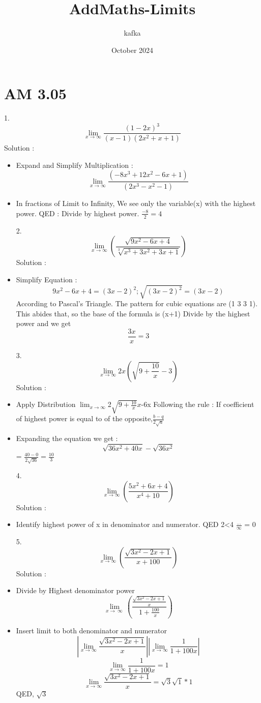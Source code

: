 \documentclass{article}
\title{AddMaths-Limits}
\author{kafka }
\date{October 2024}
\begin{document}
\maketitle


\section{AM 3.05}
1. $$\displaystyle \lim_{x\to\infty} \frac{(1-2x)^3}{(x-1)(2x^2+x+1)}$$ 
Solution :
\begin{itemize}
\item Expand and Simplify Multiplication :  
$$\displaystyle \lim_{x\to\infty}\frac{(-8x^3+12x^2-6x+1)}{(2x^3-x^2-1)}$$
\item In fractions of Limit to Infinity, We see only the variable(x) with the highest power. QED : Divide by highest power. 
$\frac{-8}{2} = 4$

2. $$\displaystyle \lim_{x\to\infty} \left(\frac{\sqrt{9x^2-6x+4}}{\sqrt[3]{x^3+3x^2+3x+1}}\right)$$
Solution : 

\item Simplify Equation : 
$$9x^2-6x+4 = (3x-2)^2; \sqrt{(3x-2)^2} = (3x-2)$$
According to Pascal's Triangle. The pattern for cubic equations are (1 3 3 1). This abides that, so the base of the formula is (x+1)
Divide by the highest power and we get $$\frac{3x}{x} = 3$$

3. $$\displaystyle \lim_{x\to\infty} 2x\left(\sqrt{9+\frac{10}{x}}-3\right)$$
Solution :

\item Apply Distribution 
$\displaystyle \lim_{x\to\infty}$2$\sqrt{9+\frac{10}{x}}x$-6x
Following the rule : If coefficient of highest power is equal to of the opposite,$\frac{b-q}{2\sqrt{a}}$
\item Expanding the equation we get :
$$\sqrt{36x^2+40x}-\sqrt{36x^2}$$ = $\frac{40-0}{2\sqrt{36}} = \frac{10}{3}$

4. $$\displaystyle \lim_{x\to\infty} \left(\frac{5x^2+6x+4}{x^4+10}\right)$$
Solution : 

\item  Identify highest power of x in denominator and numerator. QED 2<4
$\displaystyle\frac{...}{\infty}$ = 0

5. $$\displaystyle \lim_{x\to\infty}\left(\frac{\sqrt{3x^2-2x+1}}{x+100}\right)$$
Solution : 

\item Divide by Highest denominator power
$$\lim_{x\to \:\infty \:}\left(\frac{\frac{\sqrt{3x^2-2x+1}}{x}}{1+\frac{100}{x}}\right)$$
\item Insert limit to both denominator and numerator
$$\displaystyle |\lim_{x\to\infty} \frac{\sqrt{3x^2-2x+1}}{x}| |\lim_{x\to\infty}\frac{1}{1+100x}|$$
$$\displaystyle\lim_{x\to\infty}\frac{1}{1+100x} = 1$$
$$\displaystyle \lim_{x\to\infty} \frac{\sqrt{3x^2-2x+1}}{x} = \sqrt{3} \sqrt{1}*1$$
QED, $\sqrt{3}$


\end{itemize}
\end{document}
